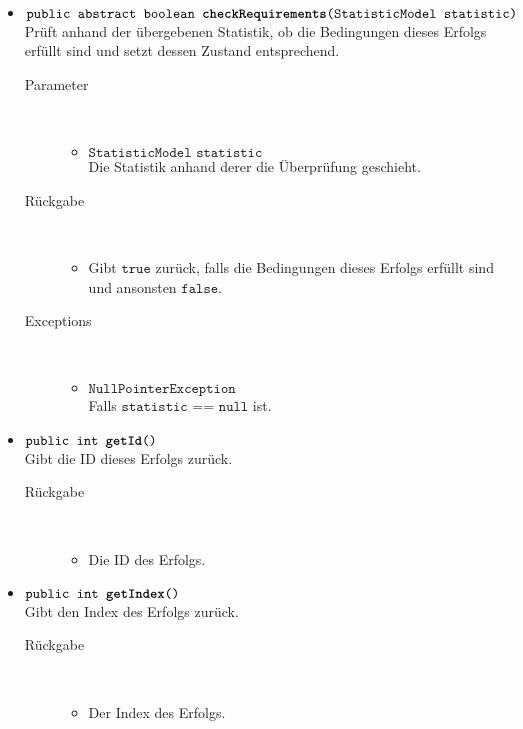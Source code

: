 \begin{description}
\begin{itemize}
		\item $\texttt{public abstract boolean \textbf{checkRequirements}(StatisticModel statistic)}$ \\ Prüft anhand der übergebenen Statistik, ob die Bedingungen dieses Erfolgs erfüllt sind und setzt dessen Zustand entsprechend.
		\begin{description}
		\item[Parameter] \hfill \\
			\vspace{-.8cm}
			\begin{itemize}
				\item $\texttt{StatisticModel statistic}$ \\ Die Statistik anhand derer die Überprüfung geschieht. 
			\end{itemize}
			\item[Rückgabe] \hfill \\
			\vspace{-.8cm}
			\begin{itemize}
				\item Gibt $\texttt{true}$ zurück, falls die Bedingungen dieses Erfolgs erfüllt sind und ansonsten $\texttt{false}$.
			\end{itemize}
			\item[Exceptions] \hfill \\
			\vspace{-.8cm}
			\begin{itemize}
				\item $\texttt{NullPointerException}$ \\ Falls $\texttt{statistic == null}$ ist.
			\end{itemize}
		\end{description}
		
		\item $\texttt{public int \textbf{getId}()}$ \\ Gibt die ID dieses Erfolgs zurück.
		\begin{description}
			\item[Rückgabe] \hfill \\
			\vspace{-.8cm}
			\begin{itemize}
				\item Die ID des Erfolgs.
			\end{itemize}
		\end{description}

\item $\texttt{public int \textbf{getIndex}()}$ \\ Gibt den Index des Erfolgs zurück.
		\begin{description}
			\item[Rückgabe] \hfill \\
			\vspace{-.8cm}
			\begin{itemize}
				\item Der Index des Erfolgs.
			\end{itemize}
		\end{description}


\end{itemize}
\end{description}
